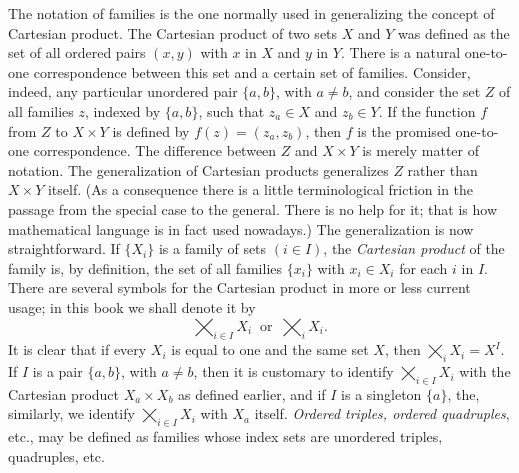 The notation of families is the one normally used in generalizing the concept of Cartesian product. The Cartesian product of two sets $X$ and $Y$ was defined as the set of all ordered pairs $(x, y)$ with $x$ in $X$ and $y$ in $Y$. There is a natural one-to-one correspondence between this set and a certain set of families. Consider, indeed, any  particular unordered pair $\{ a,b \}$, with $a \neq b$, and consider the set $Z$ of all families $z$, indexed by $\{ a,b \}$, such that $ z_{a} \in X$ and $z_{b} \in Y$. If the function $f$ from $Z$ to $X \times Y$ is defined by $f(z) = (z_{a}, z_{b})$, then $f$ is the promised one-to-one correspondence. The difference between $Z$ and $X \times Y$ is merely matter of notation. The generalization of Cartesian products generalizes $Z$ rather than $X \times Y$ itself. (As a consequence there is a little terminological friction in the passage from the special case to the general. There is no help for it; that is how mathematical language is in fact used nowadays.) The generalization is now straightforward. If $\{ X_{i} \}$ is a family of sets $(i \in I)$, the \textit{Cartesian product} of the family is, by definition, the set of all families $\{ x_{i} \}$ with $x_{i} \in X_{i}$ for each $i$ in $I$. There are several symbols for the Cartesian product in more or less current usage; in this book we shall denote it by 
\begin{equation*}
\bigtimes_{i \in I}X_{i} \: \text{ or } \: \bigtimes_{i}X_{i}.
\end{equation*}
It is clear that if every $X_{i}$ is equal to one and the same set $X$, then $\bigtimes_{i}X_{i} = X^{I}$. If $I$ is a pair $\{ a,b \}$, with $a \neq b$, then it is customary to identify $\bigtimes_{i \in I}X_{i}$ with the Cartesian product $X_{a} \times X_{b}$ as defined earlier, and if $I$ is a singleton $\{ a \}$, the, similarly, we identify $\bigtimes_{i \in I}X_{i}$ with $X_{a}$ itself. \textit{Ordered triples, ordered quadruples}, etc., may be defined as families whose index sets are unordered triples, quadruples, etc. 


